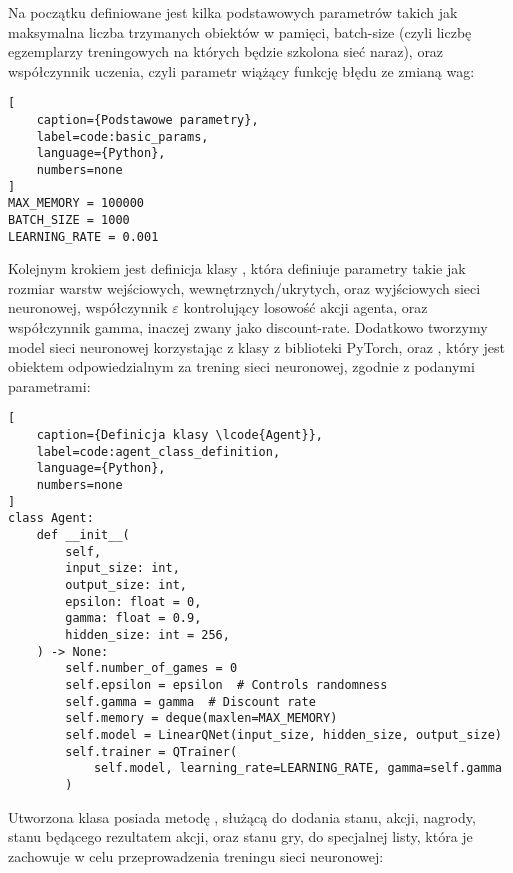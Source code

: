 Na początku definiowane jest kilka podstawowych parametrów takich jak maksymalna liczba trzymanych obiektów w pamięci, batch-size \cite{BatchNormalization} (czyli liczbę egzemplarzy treningowych na których będzie szkolona sieć naraz), oraz współczynnik uczenia, czyli parametr wiążący funkcję błędu ze zmianą wag:

\begin{onepage}
    \begin{lstlisting}[
    caption={Podstawowe parametry},
    label=code:basic_params,
    language={Python},
    numbers=none
]
MAX_MEMORY = 100000
BATCH_SIZE = 1000
LEARNING_RATE = 0.001
    \end{lstlisting}
\end{onepage}


Kolejnym krokiem jest definicja klasy , która definiuje parametry takie jak rozmiar warstw wejściowych, wewnętrznych/ukrytych, oraz wyjściowych sieci neuronowej, współczynnik $\varepsilon$ kontrolujący losowość akcji agenta, oraz współczynnik gamma, inaczej zwany jako discount-rate. Dodatkowo tworzymy model sieci neuronowej  korzystając z klasy  z biblioteki PyTorch, oraz , który jest obiektem odpowiedzialnym za trening sieci neuronowej, zgodnie z podanymi parametrami:

\begin{onepage}
    \begin{lstlisting}[
    caption={Definicja klasy \lcode{Agent}},
    label=code:agent_class_definition,
    language={Python},
    numbers=none
]
class Agent:
    def __init__(
        self,
        input_size: int,
        output_size: int,
        epsilon: float = 0,
        gamma: float = 0.9,
        hidden_size: int = 256,
    ) -> None:
        self.number_of_games = 0
        self.epsilon = epsilon  # Controls randomness
        self.gamma = gamma  # Discount rate
        self.memory = deque(maxlen=MAX_MEMORY)
        self.model = LinearQNet(input_size, hidden_size, output_size)
        self.trainer = QTrainer(
            self.model, learning_rate=LEARNING_RATE, gamma=self.gamma
        )
    \end{lstlisting}
\end{onepage}

Utworzona klasa posiada metodę , służącą do dodania stanu, akcji, nagrody, stanu będącego rezultatem akcji, oraz stanu gry, do specjalnej listy, która je zachowuje w celu przeprowadzenia treningu sieci neuronowej:


